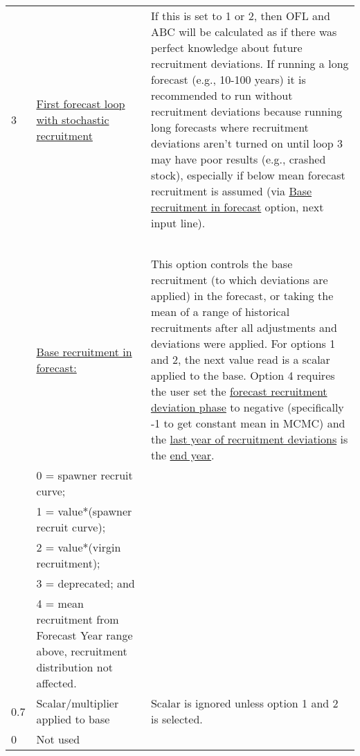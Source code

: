 \begin{landscape}
{\begin{longtable}{p{2cm} p{7cm} p{12cm}}
  \hline
  3 \Tstrut & \hyperlink{appendB}{First forecast loop with stochastic recruitment} & \multirow{1}{1cm}[-0.25cm]{\parbox{12cm}{If this is set to 1 or 2, then OFL and ABC will be calculated as if there was perfect knowledge about future recruitment deviations. If running a long forecast (e.g., 10-100 years) it is recommended to run without recruitment deviations because running long forecasts where recruitment deviations aren't turned on until loop 3 may have poor results (e.g., crashed stock), especially if below mean forecast recruitment is assumed (via \hyperlink{FcastRecruitment}{Base recruitment in forecast} option, next input line).}} \Bstrut\\
    & & \\
    & & \\
    & & \\
    & & \\
    & & \\

  \pagebreak
  1 \Tstrut & \hyperlink{ForeSpawn}{Base recruitment in forecast:} \hypertarget{FcastRecruitment}{} & \multirow{1}{1cm}[-0.25cm]{\parbox{12cm}{This option controls the base recruitment (to which deviations are applied) in the forecast, or taking the mean of a range of historical recruitments after all adjustments and deviations were applied. For options 1 and 2, the next value read is a scalar applied to the base. Option 4 requires the user set the \hyperlink{FcastRecDevPhase}{forecast recruitment deviation phase} to negative (specifically -1 to get constant mean in MCMC) and the \hyperlink{RecDevEndYear}{last year of recruitment deviations} is the \hyperlink{EndYear}{end year}.}} \\
    & 0 = spawner recruit curve; & \\
    & 1 = value*(spawner recruit curve); & \\
    & 2 = value*(virgin recruitment); & \\
    & 3 = deprecated; and & \\
    & 4 = mean recruitment from Forecast Year range above, recruitment distribution not affected. & \Bstrut\\

  \hline
  0.7 \Tstrut & Scalar/multiplier applied to base & \multirow{1}{1cm}[-0.05cm]{\parbox{12cm}{Scalar is ignored unless option 1 and 2 is selected.}} \Bstrut\\

  \hline
  0 & Not used & \Tstrut\Bstrut\\
  

\end{longtable}}
\end{landscape}
